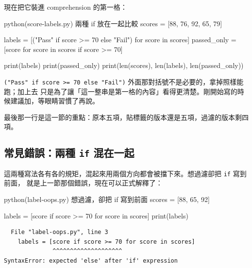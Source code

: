 現在把它裝進 comprehension 的第一格：

\begin{example}{python}{(score-labels.py) 兩種 if 放在一起比較}
scores = [88, 76, 92, 65, 79]

labels = [("Pass" if score >= 70 else "Fail") for score in scores]
passed_only = [score for score in scores if score >= 70]

print(labels)
print(passed_only)
print(len(scores), len(labels), len(passed_only))
\end{example}


\texttt{("Pass" if score >= 70 else "Fail")} 外面那對括號不是必要的，拿掉照樣能跑；加上去
只是為了讓「這一整串是第一格的內容」看得更清楚。剛開始寫的時候建議加，等眼睛習慣了再說。

最後那一行是這一節的重點：原本五項，貼標籤的版本還是五項，過濾的版本剩四項。


\subsection*{常見錯誤：兩種 \texttt{if} 混在一起}

這兩種寫法各有各的規矩，混起來用兩個方向都會被擋下來。想過濾卻把 \texttt{if} 寫到前面，
就是上一節那個錯誤，現在可以正式解釋了：

\begin{example}{python}{(label-oops.py) 想過濾，卻把 if 寫到前面}
scores = [88, 65, 92]

labels = [score if score >= 70 for score in scores]
print(labels)
\end{example}

\begin{verbatim}
  File "label-oops.py", line 3
    labels = [score if score >= 70 for score in scores]
              ^^^^^^^^^^^^^^^^^^^^
SyntaxError: expected 'else' after 'if' expression
\end{verbatim}

